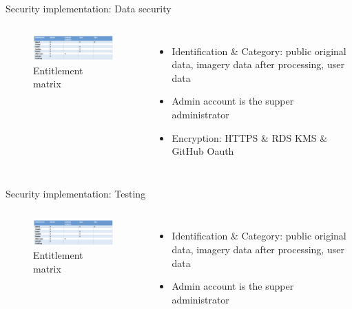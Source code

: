 \documentclass[aspectratio=169]{beamer}
\begin{document}
\begin{frame}[fragile]{Security implementation: Data security}

  \begin{columns}
      \begin{figure}[htbp]
        \centerline{\includegraphics[width=180pt]{images/matrix.png}}
        \caption{Entitlement matrix}
      \end{figure}
      \begin{itemize}
        \item Identification \& Category: public original data, imagery data after processing, user data
        \pause
        \item Admin account is the supper administrator
        \pause
        \item Encryption: HTTPS \& RDS KMS \& GitHub Oauth
      \end{itemize}
  \end{columns}

\end{frame}


\begin{frame}[fragile]{Security implementation: Testing}

  \begin{columns}
      \begin{figure}[htbp]
        \centerline{\includegraphics[width=180pt]{images/matrix.png}}
        \caption{Entitlement matrix}
      \end{figure}

      \begin{itemize}
        \item Identification \& Category: public original data, imagery data after processing, user data
        \pause
        \item Admin account is the supper administrator
        
      \end{itemize}
  \end{columns}

\end{frame}
\end{document}
